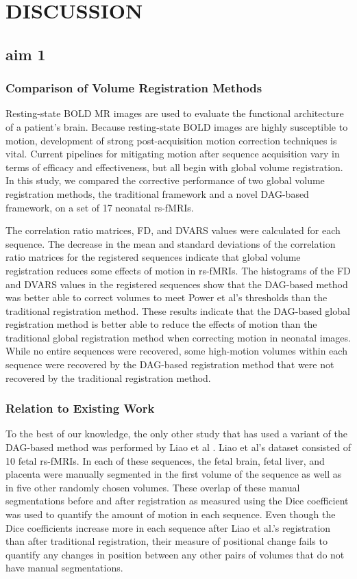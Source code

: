 \chapter{DISCUSSION}
\label{ch:discussion}

\section{aim 1}

\subsection{Comparison of Volume Registration Methods}

Resting-state BOLD MR images are used to evaluate the functional architecture of a patient's brain. Because resting-state BOLD images are highly susceptible to motion, development of strong post-acquisition motion correction techniques is vital. Current pipelines for mitigating motion after sequence acquisition vary in terms of efficacy and effectiveness, but all begin with global volume registration. In this study, we compared the corrective performance of two global volume registration methods, the traditional framework and a novel DAG-based framework, on a set of 17 neonatal rs-fMRIs. 

The correlation ratio matrices, FD, and DVARS values were calculated for each sequence. The decrease in the mean and standard deviations of the correlation ratio matrices for the registered sequences indicate that global volume registration reduces some effects of motion in rs-fMRIs. The histograms of the FD and DVARS values in the registered sequences show that the DAG-based method was better able to correct volumes to meet Power et al’s thresholds than the traditional registration method. These results indicate that the DAG-based global registration method is better able to reduce the effects of motion than the traditional global registration method when correcting motion in neonatal images. While no entire sequences were recovered, some high-motion volumes within each sequence were recovered by the DAG-based registration method that were not recovered by the traditional registration method. 

\subsection{Relation to Existing Work}
To the best of our knowledge, the only other study that has used a variant of the DAG-based method was performed by Liao et al \cite{Liao2016}. Liao et al’s dataset consisted of 10 fetal rs-fMRIs. In each of these sequences, the fetal brain, fetal liver, and placenta were manually segmented in the first volume of the sequence as well as in five other randomly chosen volumes. These overlap of these manual segmentations before and after registration as measured using the Dice coefficient was used to quantify the amount of motion in each sequence. Even though the Dice coefficients increase more in each sequence after Liao et al.’s registration than after traditional registration, their measure of positional change fails to quantify any changes in position between any other pairs of volumes that do not have manual segmentations. 

